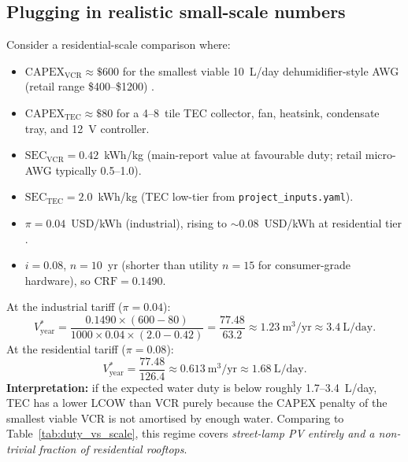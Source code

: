 \documentclass[11pt,a4paper]{article}
\begin{document}
\subsection{Plugging in realistic small-scale numbers}
Consider a residential-scale comparison where:
\begin{itemize}[nosep]
\item $\mathrm{CAPEX}_{\mathrm{VCR}}\approx \$600$ for the smallest viable 10~L/day dehumidifier-style AWG (retail range \$400--\$1200) \cite{ieeeref_commercial_awg_retail}.
\item $\mathrm{CAPEX}_{\mathrm{TEC}}\approx \$80$ for a 4--8~tile TEC collector, fan, heatsink, condensate tray, and 12~V controller.
\item $\mathrm{SEC}_{\mathrm{VCR}}=0.42$~kWh/kg (main-report value at favourable duty; retail micro-AWG typically 0.5--1.0).
\item $\mathrm{SEC}_{\mathrm{TEC}}=2.0$~kWh/kg (TEC low-tier from \texttt{project\_inputs.yaml}).
\item $\pi=0.04$~USD/kWh (industrial), rising to $\sim$0.08~USD/kWh at residential tier \cite{ieeeref_egyptera}.
\item $i=0.08$, $n=10$~yr (shorter than utility $n=15$ for consumer-grade hardware), so $\mathrm{CRF}=0.1490$.
\end{itemize}
At the industrial tariff ($\pi=0.04$):
\begin{equation}
V_{\mathrm{year}}^{*}=\frac{0.1490\times(600-80)}{1000\times 0.04\times (2.0-0.42)}
=\frac{77.48}{63.2}
\approx 1.23\ \mathrm{m^3/yr}
\approx 3.4\ \mathrm{L/day}.
\end{equation}
At the residential tariff ($\pi=0.08$):
\begin{equation}
V_{\mathrm{year}}^{*}=\frac{77.48}{126.4}
\approx 0.613\ \mathrm{m^3/yr}
\approx 1.68\ \mathrm{L/day}.
\end{equation}
\textbf{Interpretation:} if the expected water duty is below roughly 1.7--3.4~L/day, TEC has a lower LCOW than VCR purely because the CAPEX penalty of the smallest viable VCR is not amortised by enough water. Comparing to Table~\ref{tab:duty_vs_scale}, this regime covers \emph{street-lamp PV entirely and a non-trivial fraction of residential rooftops}.
\end{document}
